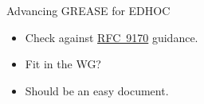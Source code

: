 \documentclass[aspectratio=169,colorlinks]{beamer}
\newcommand{\rfc}[1]{\href{https://datatracker.ietf.org/doc/html/rfc#1}{RFC~#1}}
\begin{document}
\begin{frame}{Advancing GREASE for EDHOC}\Large
  \begin{itemize}
    \item Check against \rfc{9170} guidance.
    \item Fit in the WG?
    \item Should be an easy document.
  \end{itemize}
\end{frame}
\end{document}
